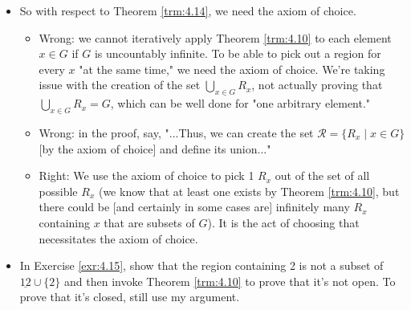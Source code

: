 \documentclass[titlepage]{report}
\begin{document}
\begin{itemize}
\begin{itemize}
    \end{itemize}
    \item So with respect to Theorem \ref{trm:4.14}, we need the axiom of choice.
    \begin{itemize}
        \item Wrong: we cannot iteratively apply Theorem \ref{trm:4.10} to each element $x\in G$ if $G$ is uncountably infinite. To be able to pick out a region for every $x$ "at the same time," we need the axiom of choice. We're taking issue with the creation of the set $\bigcup_{x\in G}R_x$, not actually proving that $\bigcup_{x\in G}R_x=G$, which can be well done for "one arbitrary element."
        \item Wrong: in the proof, say, "...Thus, we can create the set $\mathcal{R}=\{R_x\mid x\in G\}$ [by the axiom of choice] and define its union..."
        \item Right: We use the axiom of choice to pick 1 $R_x$ out of the set of all possible $R_x$ (we know that at least one exists by Theorem \ref{trm:4.10}, but there could be [and certainly in some cases are] infinitely many $R_x$ containing $x$ that are subsets of $G$). It is the act of choosing that necessitates the axiom of choice.
    \end{itemize}
    \item In Exercise \ref{exr:4.15}, show that the region containing 2 is not a subset of $\underline{12}\cup\{2\}$ and then invoke Theorem \ref{trm:4.10} to prove that it's not open. To prove that it's closed, still use my argument.
\end{itemize}
\end{document}
